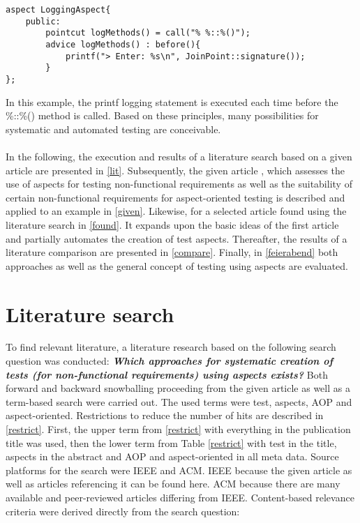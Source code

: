 \lstset {language=C++}
\begin{lstlisting}[caption={\textbf{Logging Aspect in C++.}}, label=logging]
aspect LoggingAspect{
	public:
		pointcut logMethods() = call("% %::%()");
		advice logMethods() : before(){
			printf("> Enter: %s\n", JoinPoint::signature());
		}
};
\end{lstlisting}

\newpage
In this example, the printf logging statement is executed each time before the \%::\%() method is called. Based on these principles, many possibilities for systematic and automated testing are conceivable.\\
\\
In the following, the execution and results of a literature search based on a given article are presented in \autoref{lit}. Subsequently, the given article , which assesses the use of aspects for testing non-functional requirements as well as the suitability of certain non-functional requirements for aspect-oriented testing is described and applied to an example in \autoref{given}. Likewise, for a selected article found using the literature search in \autoref{found}. It expands upon the basic ideas of the first article and partially automates the creation of test aspects. Thereafter, the results of a literature comparison are presented in \autoref{compare}. Finally, in \autoref{feierabend} both approaches as well as the general concept of testing using aspects are evaluated. 

\section{ Literature search} \label{lit}

To find relevant literature, a literature research based on the following search question was conducted: \textbf{\textit{Which approaches for systematic creation of tests (for non-functional requirements) using aspects exists?}} Both forward and backward snowballing proceeding from the given article as well as a term-based search were carried out. The used terms were test, aspects, AOP and aspect-oriented. Restrictions to reduce the number of hits are described in \autoref{restrict}. First, the upper term from \autoref{restrict} with everything in the publication title was used, then the lower term from Table \autoref{restrict} with test in the title, aspects in the abstract and AOP and aspect-oriented in all meta data. Source platforms for the search were IEEE and ACM. IEEE because the given article as well as articles referencing it can be found here. ACM because there are many available and peer-reviewed articles differing from IEEE. Content-based relevance criteria were derived directly from the search question:

